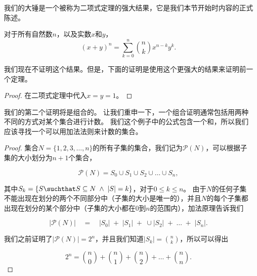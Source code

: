 我们的大锤是一个被称为二项式定理的强大结果，它是我们本节开始时内容的正式陈述。

\begin{thm}[二项式定理]
对于所有自然数$n$，以及实数$x$和$y$，
\[ (x+y)^n = \sum_{k=0}^{n} \binom{n}{k} x^{n-k}y^k. \] 
\end{thm}

我们现在不证明这个结果。但是，下面的证明是使用这个更强大的结果来证明前一个定理。

\begin{proof}
在二项式定理中代入$x=y=1$。
\end{proof}

我们的第二个证明将是组合的。
让我们重申一下，一个组合证明通常包括用两种不同的方式对某个集合进行计数。
我们这个例子中的公式包含一个和，所以我们应该寻找一个可以用加法法则来计数的集合。

\begin{proof}
集合$N = \{1, 2, 3, \ldots, n\}$的所有子集的集合，我们记为${\mathcal P}(N)$，可以根据子集的大小划分为$n+1$个集合，

\[ {\mathcal P}(N) = S_0 \cup S_1 \cup S_2 \cup \ldots \cup S_n, \]

\noindent 其中$S_k = \{ S \suchthat S \subseteq N \; \land \; |S| = k \}$，对于$0 \leq k \leq n$。
由于$N$的任何子集不能出现在划分的两个不同部分中（子集的大小是唯一的），并且$N$的每个子集都出现在划分的某个部分中（子集的大小都在0到$n$的范围内），加法原理告诉我们

\[ |{\mathcal P}(N)| \quad = \quad |S_0| \;+\; |S_1| \;+\;\cup |S_2| \;+\; \ldots \;+\; |S_n|. \]

我们之前证明了$|{\mathcal P}(N)| = 2^n$，并且我们知道$|S_k| = \binom{n}{k}$，所以可以得出

\[ 2^n = \binom{n}{0} + \binom{n}{1} +\binom{n}{2} + \ldots + \binom{n}{n}. \] 
\end{proof}

\clearpage






